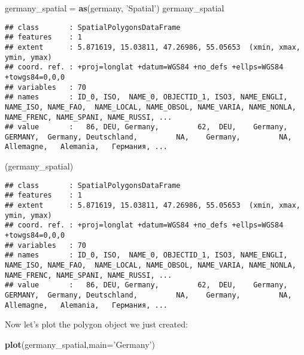 \documentclass[]{article}
\newenvironment{Shaded}{\begin{snugshade}}{\end{snugshade}}
\newcommand{\DataTypeTok}[1]{\textcolor[rgb]{0.13,0.29,0.53}{#1}}
\newcommand{\KeywordTok}[1]{\textcolor[rgb]{0.13,0.29,0.53}{\textbf{#1}}}
\newcommand{\NormalTok}[1]{#1}
\newcommand{\StringTok}[1]{\textcolor[rgb]{0.31,0.60,0.02}{#1}}
\begin{document}
\begin{Shaded}
\begin{Highlighting}[]
\NormalTok{germany_spatial =}\StringTok{ }\KeywordTok{as}\NormalTok{(germany, }\StringTok{'Spatial'}\NormalTok{)}
\NormalTok{germany_spatial}
\end{Highlighting}
\end{Shaded}

\begin{verbatim}
## class       : SpatialPolygonsDataFrame 
## features    : 1 
## extent      : 5.871619, 15.03811, 47.26986, 55.05653  (xmin, xmax, ymin, ymax)
## coord. ref. : +proj=longlat +datum=WGS84 +no_defs +ellps=WGS84 +towgs84=0,0,0 
## variables   : 70
## names       : ID_0, ISO,  NAME_0, OBJECTID_1, ISO3, NAME_ENGLI, NAME_ISO, NAME_FAO,  NAME_LOCAL, NAME_OBSOL, NAME_VARIA, NAME_NONLA, NAME_FRENC, NAME_SPANI, NAME_RUSSI, ... 
## value       :   86, DEU, Germany,         62,  DEU,    Germany,  GERMANY,  Germany, Deutschland,         NA,    Germany,         NA,  Allemagne,   Alemania,   Германия, ...
\end{verbatim}

\begin{Shaded}
\begin{Highlighting}[]
\NormalTok{(germany_spatial)}
\end{Highlighting}
\end{Shaded}

\begin{verbatim}
## class       : SpatialPolygonsDataFrame 
## features    : 1 
## extent      : 5.871619, 15.03811, 47.26986, 55.05653  (xmin, xmax, ymin, ymax)
## coord. ref. : +proj=longlat +datum=WGS84 +no_defs +ellps=WGS84 +towgs84=0,0,0 
## variables   : 70
## names       : ID_0, ISO,  NAME_0, OBJECTID_1, ISO3, NAME_ENGLI, NAME_ISO, NAME_FAO,  NAME_LOCAL, NAME_OBSOL, NAME_VARIA, NAME_NONLA, NAME_FRENC, NAME_SPANI, NAME_RUSSI, ... 
## value       :   86, DEU, Germany,         62,  DEU,    Germany,  GERMANY,  Germany, Deutschland,         NA,    Germany,         NA,  Allemagne,   Alemania,   Германия, ...
\end{verbatim}

Now let's plot the polygon object we just created:

\begin{Shaded}
\begin{Highlighting}[]
\KeywordTok{plot}\NormalTok{(germany_spatial,}\DataTypeTok{main=}\StringTok{'Germany'}\NormalTok{)}
\end{Highlighting}
\end{Shaded}
\end{document}
